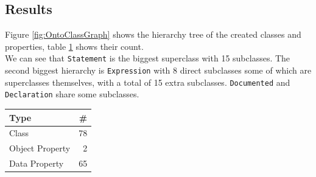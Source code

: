 \documentclass [14 pt]{article}
\begin{document}
\subsection{Results}
Figure \ref{fig:OntoClassGraph} shows the hierarchy tree of the created classes and properties, table \ref{tab:Population} shows their count.\\
We can see that \texttt{Statement} is the biggest superclass with 15 subclasses. The second biggest hierarchy is \texttt{Expression} with 8 direct subclasses some of which are superclasses themselves, with a total of 15 extra subclasses. \texttt{Documented} and \texttt{Declaration} share some subclasses.

\begin{table}[h]
\centering
\begin{tabular}{| l r |}
\hline
\textbf{Type}		&  \textbf{\#}	\\ \hline\hline
Class	 			&	78	\\
Object Property		&	2	\\
Data Property		&	65	\\ \hline
\hline
\end{tabular}
\label{tab:Population}
\end{table}
\end{document}

